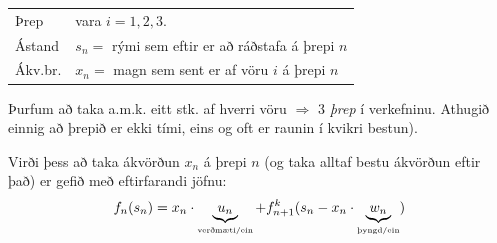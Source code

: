 \begin{lausn}\hspace{.1cm}

\begin{center}
\begin{tabular}{ll}
    Þrep & vara $i=1,2,3$. \\
    Ástand & $s_n=$ rými sem eftir er að ráðstafa á þrepi $n$\\
    Ákv.br.&  $x_n=$ magn sem sent er af vöru $i$ á þrepi $n$
\end{tabular}
\end{center}
\begin{aths}Þurfum að taka a.m.k. eitt stk. af hverri vöru $\Rightarrow$ 3 \emph{þrep} í verkefninu. Athugið einnig að þrepið er ekki tími, eins og oft er raunin í kvikri bestun).\end{aths}

Virði þess að taka ákvörðun $x_n$ á þrepi $n$ (og taka alltaf bestu ákvörðun eftir það) er gefið með eftirfarandi jöfnu:
$$ f_n(s_n)=x_n\cdot\underbrace{u_n}_{\tiny \mbox{verðmæti/ein}}+f^k_{n+1}(s_n-x_n\cdot\underbrace{w_n}_{\tiny \mbox{þyngd/ein}})$$


\end{lausn}
